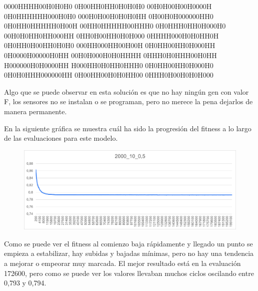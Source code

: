 \documentclass[12pt, spanish, pdftex]{UC3M_document}
\begin{document}
0000HHHH00H0H0H0 0H00HH0HH0H0H0H0 00H0H00H00H0000H 0H0HHHHHH000H0H0 000H0H00H0H0H0HH 0H00H0H000000HH0 0H0HH0HHHHH0H00H 00HH0HHHHH00HHH0 0H0HHH0HH0H000H0 00H0H0HH0HH000HH 0HH0H00HH0H0H000 0HHHH000H0H0HH0H 0H0HH0H00HH0H0H0 000HH000HH00H00H 0H0HH00HH0H000HH 0H0000H00000H0HH 00H0H000H0H0HHHH 0HHH0H0HHH00H0HH H000000H0H0000HH H000HH0H0HH0HHH0 0H0HH00HH0H000H0 0H0H0HHH000000HH 0H00HH00H0H0HH00 0HHH0H00H0H0H000

Algo que se puede observar en esta solución es que no hay ningún gen con valor F, los sensores no se instalan o se programan, pero no merece la pena dejarlos de manera permanente.

En la siguiente gráfica se muestra cuál ha sido la progresión del fitness a lo largo de las evaluaciones para este modelo.
\begin{figure}[H]
	{\includegraphics[scale=.8]{./img/2000_10_0,5.png}}
\end{figure}
\pagebreak

Como se puede ver el fitness al comienzo baja rápidamente y llegado un punto se empieza a estabilizar, hay subidas y bajadas mínimas, pero no hay una tendencia a mejorar o empeorar muy marcada. El mejor resultado está en la evaluación 172600, pero como se puede ver los valores llevaban muchos ciclos oscilando entre 0,793 y 0,794.
\end{document}
